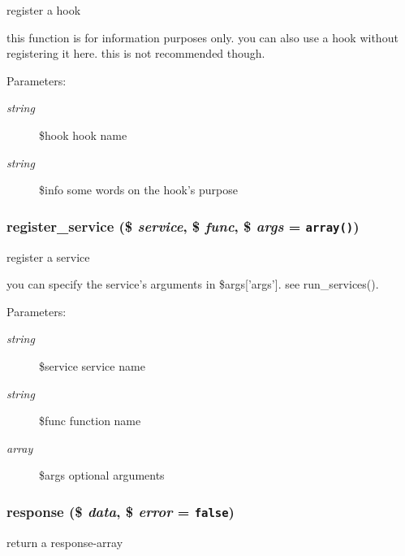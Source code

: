 register a hook

this function is for information purposes only. you can also use a hook without registering it here. this is not recommended though. \begin{Desc}
\item[Parameters:]
\begin{description}
\item[{\em string}]\$hook hook name \item[{\em string}]\$info some words on the hook's purpose \end{description}
\end{Desc}
\hypertarget{modules_8inc_8php_e6ed600fb2ce39a4b0837bbb01fe8d6e}{
\subsubsection[{register\_\-service}]{\setlength{\rightskip}{0pt plus 5cm}register\_\-service (\$ {\em service}, \/  \$ {\em func}, \/  \$ {\em args} = {\tt array()})}}
\label{modules_8inc_8php_e6ed600fb2ce39a4b0837bbb01fe8d6e}


register a service

you can specify the service's arguments in \$args\mbox{[}'args'\mbox{]}. see run\_\-services(). \begin{Desc}
\item[Parameters:]
\begin{description}
\item[{\em string}]\$service service name \item[{\em string}]\$func function name \item[{\em array}]\$args optional arguments \end{description}
\end{Desc}
\hypertarget{modules_8inc_8php_361058ff2a03c098045c4442440a2574}{
\subsubsection[{response}]{\setlength{\rightskip}{0pt plus 5cm}response (\$ {\em data}, \/  \$ {\em error} = {\tt false})}}
\label{modules_8inc_8php_361058ff2a03c098045c4442440a2574}


return a response-array

